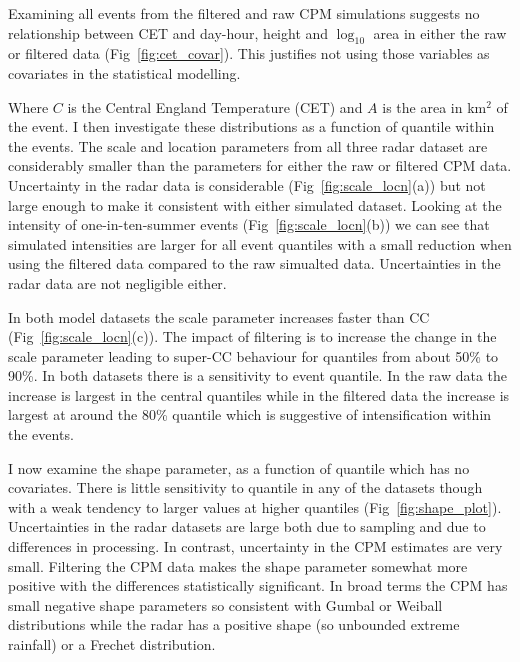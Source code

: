 \documentclass[11pt,a4paper]{article}
\begin{document}
Examining all events from the filtered and raw CPM simulations suggests no relationship between CET and day-hour, height and $\log_{10}$ area in either the raw or filtered data (Fig~\ref{fig:cet_covar}). This justifies not using those variables as covariates in the statistical modelling. 



Where $C$ is the Central England Temperature (CET) and $A$ is the area in km$^2$ of the event.  I then investigate these distributions as a function of quantile within the events.  The scale and location parameters from all three radar dataset are considerably smaller than the parameters for either the raw or filtered CPM data. Uncertainty in the radar data is considerable (Fig~\ref{fig:scale_locn}(a)) but not large enough to make it consistent with either simulated dataset.  Looking at the intensity of one-in-ten-summer events (Fig~\ref{fig:scale_locn}(b)) we can see that simulated intensities are larger for all event quantiles with a small reduction when using the filtered data compared to the raw simualted data. Uncertainties in the radar data are not  negligible either. 

In both model datasets the scale parameter increases faster than CC (Fig~\ref{fig:scale_locn}(c)). The impact of filtering is to increase the change in the scale parameter leading to super-CC behaviour for quantiles from about 50\% to 90\%.  In both datasets there is a sensitivity to event quantile. In the raw data the increase is largest in the central quantiles while in the filtered data the increase is largest at around the 80\% quantile which is suggestive of intensification within the events. 

I now examine the shape parameter, as a function of quantile which  has no covariates.  There is little sensitivity to quantile in any of the datasets though with a weak tendency to larger values at higher quantiles (Fig~\ref{fig:shape_plot}).  Uncertainties in the radar datasets are large both due to sampling and due to differences in processing. In contrast, uncertainty in the CPM estimates are very small. Filtering the CPM data makes the shape parameter somewhat more positive with the differences statistically significant. In broad terms the CPM has small negative  shape parameters so consistent with Gumbal or Weiball distributions while the radar has a positive shape (so unbounded extreme rainfall)  or a Frechet distribution. 
\end{document}
